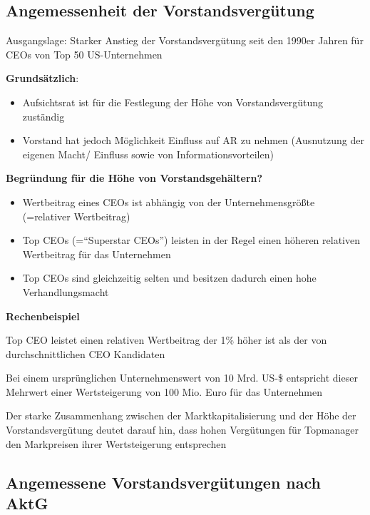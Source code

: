 \documentclass[
]{article}
\providecommand{\tightlist}{%
  \setlength{\itemsep}{0pt}\setlength{\parskip}{0pt}}
\begin{document}
\hypertarget{angemessenheit-der-vorstandsverguxfctung}{%
\subsection{Angemessenheit der
Vorstandsvergütung}\label{angemessenheit-der-vorstandsverguxfctung}}

Ausgangslage: Starker Anstieg der Vorstandsvergütung seit den 1990er
Jahren für CEOs von Top 50 US-Unternehmen

\textbf{Grundsätzlich}:

\begin{itemize}
\tightlist
\item
  Aufsichtsrat ist für die Festlegung der Höhe von Vorstandsvergütung
  zuständig
\item
  Vorstand hat jedoch Möglichkeit Einfluss auf AR zu nehmen (Ausnutzung
  der eigenen Macht/ Einfluss sowie von Informationsvorteilen)
\end{itemize}

\textbf{Begründung für die Höhe von Vorstandsgehältern?}

\begin{itemize}
\tightlist
\item
  Wertbeitrag eines CEOs ist abhängig von der Unternehmensgrößte
  (=relativer Wertbeitrag)
\item
  Top CEOs (=``Superstar CEOs'') leisten in der Regel einen höheren
  relativen Wertbeitrag für das Unternehmen
\item
  Top CEOs sind gleichzeitig selten und besitzen dadurch einen hohe
  Verhandlungsmacht
\end{itemize}

\textbf{Rechenbeispiel}

Top CEO leistet einen relativen Wertbeitrag der 1\% höher ist als der
von durchschnittlichen CEO Kandidaten

Bei einem ursprünglichen Unternehmenswert von 10 Mrd. US-\$ entspricht
dieser Mehrwert einer Wertsteigerung von 100 Mio. Euro für das
Unternehmen

Der starke Zusammenhang zwischen der Marktkapitalisierung und der Höhe
der Vorstandsvergütung deutet darauf hin, dass hohen Vergütungen für
Topmanager den Markpreisen ihrer Wertsteigerung entsprechen

\hypertarget{angemessene-vorstandsverguxfctungen-nach-aktg}{%
\subsection{Angemessene Vorstandsvergütungen nach
AktG}\label{angemessene-vorstandsverguxfctungen-nach-aktg}}
\end{document}
